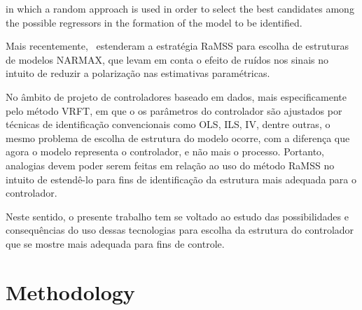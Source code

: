 in which a random approach is used in order to select the best candidates among the possible regressors in the formation of the model to be identified.


Mais recentemente,~\cite{retesNARMAXModelIdentification2019} estenderam a estratégia RaMSS para escolha de estruturas de modelos NARMAX, que levam em conta o efeito de ruídos nos sinais no intuito de reduzir a polarização nas estimativas paramétricas. 

No âmbito de projeto de controladores baseado em dados, mais especificamente pelo método VRFT, em que o os parâmetros do controlador são ajustados por técnicas de identificação convencionais como OLS, ILS, IV, dentre outras, o mesmo problema de escolha de estrutura do modelo ocorre, com a diferença que agora o modelo representa o controlador, e não mais o processo. Portanto, analogias devem poder serem feitas em relação ao uso do método RaMSS no intuito de estendê-lo para fins de identificação da estrutura mais adequada para o controlador.

Neste sentido, o presente trabalho tem se voltado ao estudo das possibilidades e consequências do uso dessas tecnologias para escolha da estrutura do controlador que se mostre mais adequada para fins de controle. 



\section{Methodology}\label{sec:CSS_metod} 

